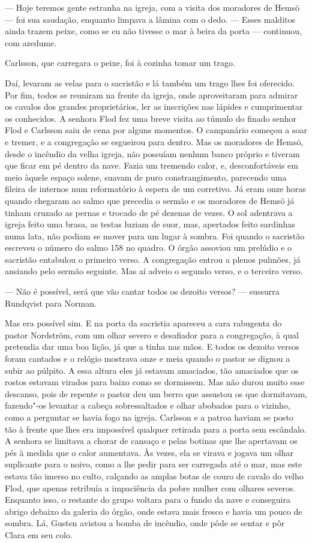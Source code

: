 --- Hoje teremos gente estranha na igreja, com a visita dos moradores de Hemsö ---
foi sua saudação, enquanto limpava a lâmina com o dedo. --- Esses malditos ainda 
trazem peixe, como se eu não tivesse o mar à beira da porta --- continuou, com azedume.

Carlsson, que carregara o peixe, foi à cozinha tomar um trago.

Daí, levaram as velas para o sacristão e lá também um trago lhes foi oferecido.
Por fim, todos se reuniram na frente da igreja, onde aproveitaram para admirar
os cavalos dos grandes proprietários, ler as inscrições nas lápides e
cumprimentar os conhecidos. A senhora Flod fez uma breve visita ao túmulo do
finado senhor Flod e Carlsson saiu de cena por alguns momentos. O
campanário começou a soar e tremer, e a congregação se esgueirou para
dentro. Mas os moradores de Hemsö, desde o incêndio da velha igreja, 
não possuíam nenhum banco próprio e tiveram que ficar em pé dentro da nave.
Fazia um tremendo calor, e, desconfortáveis em meio àquele espaço solene,
suavam de puro constrangimento, parecendo uma fileira de internos num
reformatório à espera de um corretivo. Já eram onze horas quando chegaram ao salmo
que precedia o sermão e os moradores de Hemsö já tinham cruzado as pernas e trocado
de pé dezenas de vezes. O sol adentrava a igreja feito uma brasa, as testas
luziam de suor, mas, apertados feito sardinhas numa lata, não podiam se
mover para um lugar à sombra. Foi quando o sacristão escreveu o número do salmo 158
no quadro. O órgão assoviou um prelúdio e o sacristão entabulou o primeiro verso.
A congregação entrou a plenos pulmões, já ansiando pelo sermão seguinte. Mas aí
adveio o segundo verso, e o terceiro verso.

--- Não é possível, será que vão cantar todos os dezoito versos? --- sussurra
Rundqvist para Norman.

Mas era possível sim. E na porta da sacristia apareceu a cara rabugenta do
pastor Nordström, com um olhar severo e desafiador para a congregação, à qual
pretendia dar uma boa lição, já que a tinha nas mãos. E todos os dezoito versos
foram cantados e o relógio mostrava onze e meia quando o pastor se dignou a subir
ao púlpito. A essa altura eles já estavam amaciados, tão amaciados que os rostos
estavam virados para baixo como se dormissem. Mas não durou muito esse descanso,
pois de repente o pastor deu um berro que assustou os que dormitavam, fazendo"-os
levantar a cabeça sobressaltados e olhar abobados para o vizinho, como a perguntar se
havia fogo na igreja. Carlsson e a patroa haviam se posto tão à frente que
lhes era impossível qualquer retirada para a porta sem escândalo. A senhora se
limitava a chorar de cansaço e pelas botinas que lhe apertavam os pés à medida que
o calor aumentava. Às vezes, ela se virava e jogava um olhar suplicante para o noivo,
como a lhe pedir para ser carregada até o mar, mas este estava tão imerso no
culto, calçando as amplas botas de couro de cavalo do velho Flod, que apenas
retribuía a impaciência da pobre mulher com olhares severos. Enquanto isso, o
restante do grupo voltara para o fundo da nave e conseguira abrigo
debaixo da galeria do órgão, onde estava mais fresco e havia um pouco de sombra.
Lá, Gusten avistou a bomba de incêndio, onde pôde se sentar e pôr Clara em seu colo.

